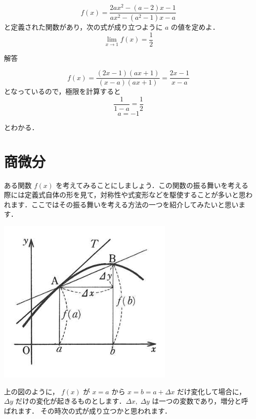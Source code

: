 \documentclass[
  letterpaper,
  DIV=11,
  numbers=noendperiod]{scrreprt}
\begin{document}
\begin{tcolorbox}[enhanced jigsaw, colbacktitle=quarto-callout-tip-color!10!white, opacitybacktitle=0.6, breakable, opacityback=0, titlerule=0mm, leftrule=.75mm, arc=.35mm, colback=white, bottomrule=.15mm, toprule=.15mm, rightrule=.15mm, coltitle=black, left=2mm, colframe=quarto-callout-tip-color-frame, toptitle=1mm, title={問題}, bottomtitle=1mm]

\[f(x)=\frac{2ax^2-(a-2)x-1}{ax^2-(a^2-1)x-a}\]
と定義された関数があり，次の式が成り立つように \(a\) の値を定めよ．
\[\lim_{x \to 1}f(x)=\frac{1}{2}\]

\end{tcolorbox}

解答

\[f(x)=\frac{(2x-1)(ax+1)}{(x-a)(ax+1)}=\frac{2x-1}{x-a}\]
となっているので，極限を計算すると \[\frac{1}{1-a}=\frac{1}{2}\]
\[a=-1\]

とわかる．

\hypertarget{ux5546ux5faeux5206}{%
\section{商微分}\label{ux5546ux5faeux5206}}

ある関数 \(f(x)\)
を考えてみることにしましょう．この関数の振る舞いを考える際には定義式自体の形を見て，対称性や式変形などを駆使することが多いと思われます．ここではその振る舞いを考える方法の一つを紹介してみたいと思います．

\includegraphics{./images/intro-1.png}

上の図のように， \(f(x)\) が \(x=a\) から \(x=b=a+\Delta x\)
だけ変化して場合に， \(\Delta y\)
だけの変化が起きるものとします．\(\Delta x,\; \Delta y\)
は一つの変数であり，増分と呼ばれます．
その時次の式が成り立つかと思われます．
\end{document}
